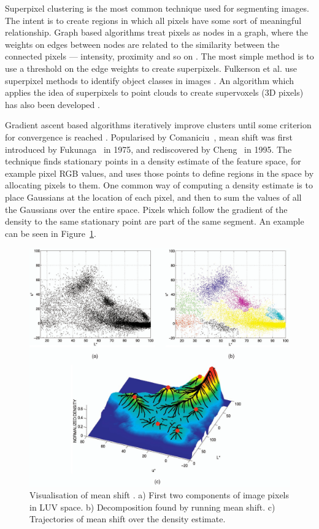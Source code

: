\documentclass[11pt,a4paper]{kth-mag}
\begin{document}
Superpixel clustering is the most common technique used for segmenting images.
The intent is to create regions in which all pixels have some sort of meaningful
relationship. Graph based algorithms treat pixels as nodes in a graph, where the
weights on edges between nodes are related to the similarity between the
connected pixels --- intensity, proximity and so on \cite{achanta2012slic}. The
most simple method is to use a threshold on the edge weights to create
superpixels. Fulkerson et al. use superpixel methods to identify object classes
in images \cite{fulkerson2009class}. An algorithm which applies the idea of
superpixels to point clouds to create supervoxels (3D pixels) has also been
developed \cite{papon2013voxel}.

Gradient ascent based algorithms iteratively improve clusters until some
criterion for convergence is reached \cite{achanta2012slic}. Popularised by
Comaniciu~\cite{comaniciu2002mean}, mean shift was first introduced by
Fukunaga~\cite{fukunaga1975estimation} in 1975, and rediscovered by
Cheng~\cite{cheng1995mean} in 1995. The technique finds stationary points in a
density estimate of the feature space, for example pixel RGB values, and uses
those points to define regions in the space by allocating pixels to them. One
common way of computing a density estimate is to place Gaussians at the location
of each pixel, and then to sum the values of all the Gaussians over the entire
space. Pixels which follow the gradient of the density to the same stationary
point are part of the same segment. An example can be seen in
Figure~\ref{fig:meanshift}.
\begin{figure}[t]
  \centering
  \includegraphics[width=\textwidth]{images/meanshift}
  \caption{Visualisation of mean shift \cite{comaniciu2002mean}. a) First two
    components of image pixels in LUV space. b) Decomposition found by running
    mean shift. c) Trajectories of mean shift over the density estimate.}
  \label{fig:meanshift}
\end{figure}
\end{document}
